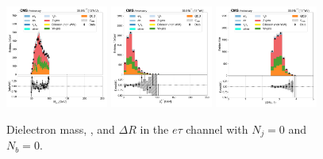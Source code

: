 \begin{figure}[htb!]
    \centering
    \includegraphics[width=0.3\textwidth]{chapters/Appendix/sectionPlots/figures/data_mc_overlays/etau_2016_cat_eq1_eq0_signal_linear_lepton_dilepton1_mass}
    \includegraphics[width=0.3\textwidth]{chapters/Appendix/sectionPlots/figures/data_mc_overlays/etau_2016_cat_eq1_eq0_signal_linear_lepton_dilepton1_pt}
    \includegraphics[width=0.3\textwidth]{chapters/Appendix/sectionPlots/figures/data_mc_overlays/etau_2016_cat_eq1_eq0_signal_linear_lepton_dilepton1_delta_r}
    \caption{Dielectron mass, \pt, and $\Delta R$ in the $e\tau$ channel
    with $N_{j} = 0$ and $N_{b} = 0$.}
    \label{fig:etau_2_dilepton}
\end{figure}

